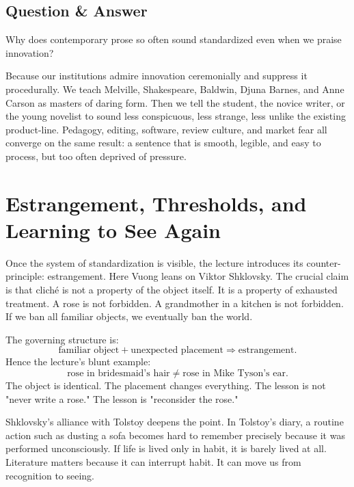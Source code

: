 \subsection{Question \& Answer}

Why does contemporary prose so often sound standardized even when we praise innovation?

Because our institutions admire innovation ceremonially and suppress it procedurally. We teach Melville, Shakespeare, Baldwin, Djuna Barnes, and Anne Carson as masters of daring form. Then we tell the student, the novice writer, or the young novelist to sound less conspicuous, less strange, less unlike the existing product-line. Pedagogy, editing, software, review culture, and market fear all converge on the same result: a sentence that is smooth, legible, and easy to process, but too often deprived of pressure.

\section{Estrangement, Thresholds, and Learning to See Again}

Once the system of standardization is visible, the lecture introduces its counter-principle: estrangement. Here Vuong leans on Viktor Shklovsky. The crucial claim is that cliché is not a property of the object itself. It is a property of exhausted treatment. A rose is not forbidden. A grandmother in a kitchen is not forbidden. If we ban all familiar objects, we eventually ban the world.

The governing structure is:
\begin{equation}
\text{familiar object} + \text{unexpected placement} \Longrightarrow \text{estrangement}.
\end{equation}
Hence the lecture's blunt example:
\begin{equation}
\text{rose in bridesmaid's hair} \neq \text{rose in Mike Tyson's ear}.
\end{equation}
The object is identical. The placement changes everything. The lesson is not "never write a rose." The lesson is "reconsider the rose."

Shklovsky's alliance with Tolstoy deepens the point. In Tolstoy's diary, a routine action such as dusting a sofa becomes hard to remember precisely because it was performed unconsciously. If life is lived only in habit, it is barely lived at all. Literature matters because it can interrupt habit. It can move us from recognition to seeing.

